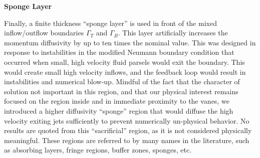 \textbf{Sponge Layer} 

Finally, a finite thickness ``sponge layer'' is used in front of the
mixed inflow/outflow boundaries $\Gamma_T$ and $\Gamma_B$.
This layer artificially increases the momentum diffusivity by
up to ten times the nominal value. This was designed in response to
instabilities in the modified Neumann boundary condition that occurred
when small, high velocity fluid parsels would exit the boundary. This
would create small high velocity inflows, and the feedback loop would
result in instabilities and numerical blow-up. Mindful of the fact that
the character of solution not important in this region, and that our
physical interest remains focused on the region inside and in immediate
proximity to the vanes, we introduced a higher diffusivity ``sponge''
region that would diffuse the high velocity exiting jets sufficiently to
prevent numerically un-physical behavior. No results are quoted from
this ``sacrificial'' region, as it is not considered physically
meaningful. These regions are referred to by many names in the
literature\cite{doi:10.1146/annurev.fluid.36.050802.121930}, such as
absorbing layers, fringe regions, buffer zones, sponges, etc. 


